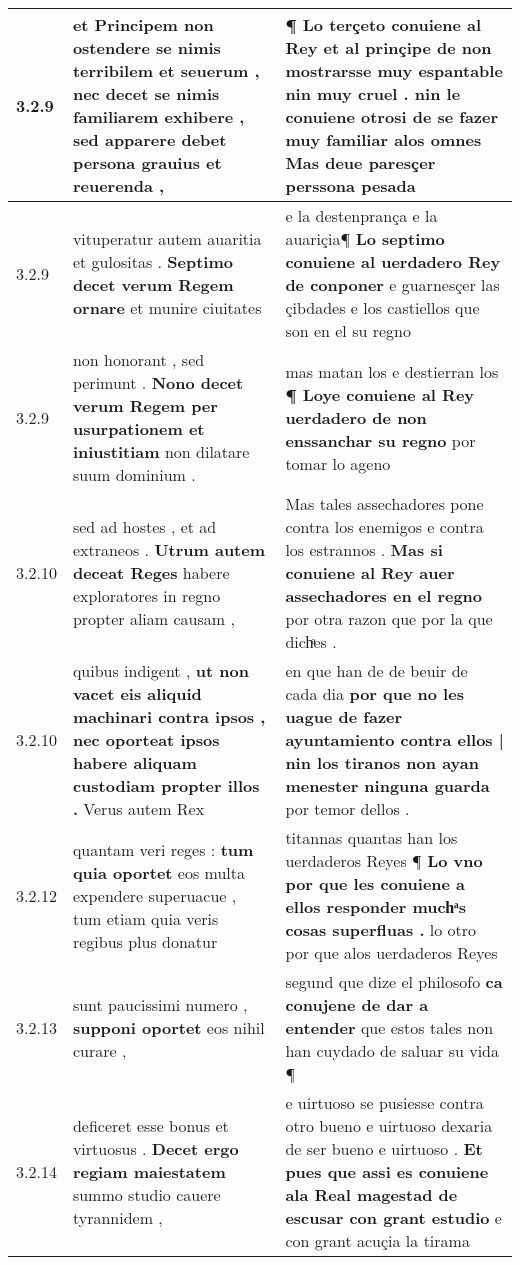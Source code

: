 \begin{tabular}{|p{1cm}|p{6.5cm}|p{6.5cm}|}
3.2.9 & et Principem non ostendere se nimis terribilem et seuerum , \textbf{ nec decet se nimis familiarem exhibere , } sed apparere debet persona grauius et reuerenda , & ¶ Lo terçeto conuiene al Rey et al prinçipe de non mostrarsse muy espantable nin muy cruel . \textbf{ nin le conuiene otrosi de se fazer muy familiar alos omnes } Mas deue paresçer perssona pesada \\\hline
3.2.9 & vituperatur autem auaritia et gulositas . \textbf{ Septimo decet verum Regem ornare } et munire ciuitates & e la destenprança e la auariçia¶ \textbf{ Lo septimo conuiene al uerdadero Rey de conponer } e guarnesçer las çibdades e los castiellos que son en el su regno \\\hline
3.2.9 & non honorant , sed perimunt . \textbf{ Nono decet verum Regem per usurpationem et iniustitiam } non dilatare suum dominium . & mas matan los e destierran los \textbf{ ¶ Loye conuiene al Rey uerdadero de non enssanchar su regno } por tomar lo ageno \\\hline
3.2.10 & sed ad hostes , et ad extraneos . \textbf{ Utrum autem deceat Reges } habere exploratores in regno propter aliam causam , & Mas tales assechadores pone contra los enemigos e contra los estrannos . \textbf{ Mas si conuiene al Rey auer assechadores en el regno } por otra razon que por la que dichͣes . \\\hline
3.2.10 & quibus indigent , \textbf{ ut non vacet eis aliquid machinari contra ipsos , nec oporteat ipsos habere aliquam custodiam propter illos . } Verus autem Rex & en que han de de beuir de cada dia \textbf{ por que no les uague de fazer ayuntamiento contra ellos | nin los tiranos non ayan menester ninguna guarda } por temor dellos . \\\hline
3.2.12 & quantam veri reges : \textbf{ tum quia oportet } eos multa expendere superuacue , tum etiam quia veris regibus plus donatur & titannas quantas han los uerdaderos Reyes ¶ \textbf{ Lo vno por que les conuiene a ellos responder muchͣs cosas superfluas . } lo otro por que alos uerdaderos Reyes \\\hline
3.2.13 & sunt paucissimi numero , \textbf{ supponi oportet } eos nihil curare , & segund que dize el philosofo \textbf{ ca conujene de dar a entender } que estos tales non han cuydado de saluar su vida ¶ \\\hline
3.2.14 & deficeret esse bonus et virtuosus . \textbf{ Decet ergo regiam maiestatem } summo studio cauere tyrannidem , & e uirtuoso se pusiesse contra otro bueno e uirtuoso dexaria de ser bueno e uirtuoso . \textbf{ Et pues que assi es conuiene ala Real magestad de escusar con grant estudio } e con grant acuçia la tirama \\\hline

\end{tabular}
